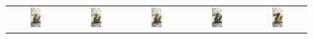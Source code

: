\begin{figure}
\centering
\begin{tabular}{@{}c@{}c@{}c@{}c@{}c@{}}
\includegraphics[width=0.2\textwidth]{figures/thesis_pt}& 	 \includegraphics[width=0.2\textwidth]{figures/thesis_pt_unconverged} &
\includegraphics[width=0.2\textwidth]{figures/thesis_pt_unconverged2}& 	 	 \includegraphics[width=0.2\textwidth]{figures/thesis_pt_sd}& 	 	 \includegraphics[width=0.2\textwidth]{figures/thesis_pt_lambertian} \\

\end{tabular}
\end{figure}

